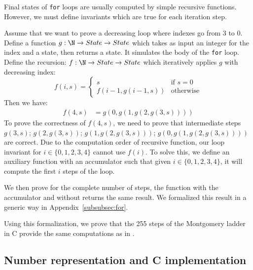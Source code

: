Final states of \texttt{for} loops are usually computed by simple recursive functions.
However, we must define invariants which are true for each iteration step.

Assume that we want to prove a decreasing loop where indexes go from 3 to 0.
Define a function $g : \N \rightarrow State  \rightarrow State $ which takes as
input an integer for the index and a state, then returns a state.
It simulates the body of the \texttt{for} loop.
Define the recursion: $f : \N \rightarrow State \rightarrow State $ which
iteratively applies $g$ with decreasing index:
\begin{equation*}
  f ( i , s ) =
  \begin{cases}
  s & \text{if } s = 0 \\
  f( i - 1 , g ( i - 1  , s )) & \text{otherwise}
  \end{cases}
\end{equation*}
Then we have:
\begin{align*}
  f(4,s) &= g(0,g(1,g(2,g(3,s))))
\end{align*}
To prove the correctness of $f(4,s)$, we need to prove that intermediate steps
$g(3,s)$; $g(2,g(3,s))$; $g(1,g(2,g(3,s)))$; $g(0,g(1,g(2,g(3,s))))$ are correct.
Due to the computation order of recursive function, our loop invariant for
$i\in\{0,1,2,3,4\}$ cannot use $f(i)$.
To solve this, we define an auxiliary function with an accumulator such that
given $i\in\{0,1,2,3,4\}$, it will compute the first $i$ steps of the loop.

We then prove for the complete number of steps, the function with the accumulator
and without returns the same result.
We formalized this result in a generic way in Appendix~\ref{subsubsec:for}.

Using this formalization, we prove that the 255 steps of the Montgomery ladder
in C provide the same computations as in .





\subsection{Number representation and C implementation}
\label{subsec:num-repr-rfc}

